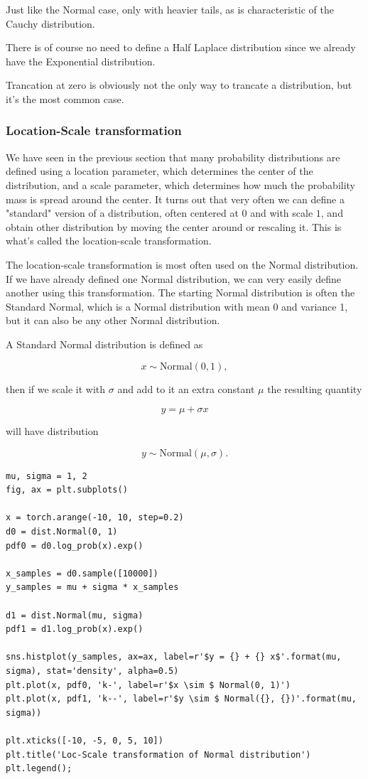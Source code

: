 \documentclass[11pt]{article}
\begin{document}
Just like the Normal case, only with heavier tails, as is characteristic of the Cauchy distribution.

There is of course no need to define a Half Laplace distribution since we already have the Exponential distribution.

Trancation at zero is obviously not the only way to trancate a distribution, but it's the most common case.

\subsubsection{Location-Scale transformation}
\label{sec:org04fe9f3}

We have seen in the previous section that many probability distributions are defined using a location parameter, which determines the center of the distribution, and a scale parameter, which determines how much the probability mass is spread around the center. It turns out that very often we can define a "standard" version of a distribution, often centered at \(0\) and with scale \(1\), and obtain other distribution by moving the center around or rescaling it. This is what's called the location-scale transformation.

The location-scale transformation is most often used on the Normal distribution. If we have already defined one Normal distribution, we can very easily define another using this transformation. The starting Normal distribution is often the Standard Normal, which is a Normal distribution with mean 0 and variance 1, but it can also be any other Normal distribution.

A Standard Normal distribution is defined as

$$x \sim \text{Normal} (0, 1),$$

then if we scale it with \(\sigma\) and add to it an extra constant \(\mu\) the resulting quantity

$$y = \mu + \sigma x$$

will have distribution

$$y \sim \text{Normal} (\mu, \sigma).$$

\begin{verbatim}
mu, sigma = 1, 2
fig, ax = plt.subplots()

x = torch.arange(-10, 10, step=0.2)
d0 = dist.Normal(0, 1)
pdf0 = d0.log_prob(x).exp()

x_samples = d0.sample([10000])
y_samples = mu + sigma * x_samples

d1 = dist.Normal(mu, sigma)
pdf1 = d1.log_prob(x).exp()

sns.histplot(y_samples, ax=ax, label=r'$y = {} + {} x$'.format(mu, sigma), stat='density', alpha=0.5)
plt.plot(x, pdf0, 'k-', label=r'$x \sim $ Normal(0, 1)')
plt.plot(x, pdf1, 'k--', label=r'$y \sim $ Normal({}, {})'.format(mu, sigma))

plt.xticks([-10, -5, 0, 5, 10])
plt.title('Loc-Scale transformation of Normal distribution')
plt.legend();
\end{verbatim}
\end{document}
